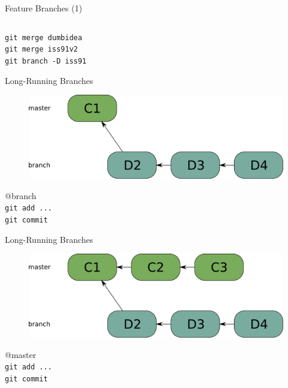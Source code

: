 \begin{frame}{Feature Branches (1)}
\begin{columns}[T]
\begin{column}{.45\textwidth}
\begin{block}{}
    \end{block}
  \end{column}
\end{columns}  
\begin{tiny}
\pause \texttt{git merge dumbidea} \\
\pause \texttt{git merge iss91v2} \\
\pause \texttt{git branch -D iss91} \\
\end{tiny}
\end{frame}

\begin{frame}{Long-Running Branches}
\begin{figure} 
\centering
  \includegraphics[scale=0.5]{images/long-running-branch.pdf}
\end{figure}
\begin{tiny}
\pause @branch \\
\pause \texttt{git add ...} \\
\pause \texttt{git commit} \\
\end{tiny}
\end{frame}

\begin{frame}{Long-Running Branches}
\begin{figure} 
\centering
  \includegraphics[scale=0.5]{images/long-running-branch2.pdf}
\end{figure}
\begin{tiny}
\pause @master \\
\pause \texttt{git add ...} \\
\pause \texttt{git commit} \\
\end{tiny}

\end{frame}

